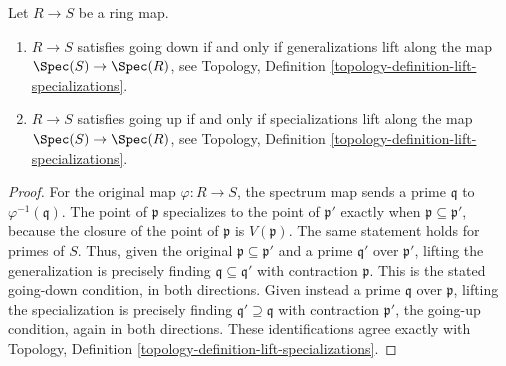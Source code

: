 \begin{lemma}
\label{lemma-going-up-down-specialization}
Let $R \to S$ be a ring map.
\begin{enumerate}
\item $R \to S$ satisfies going down if and only if
generalizations lift along the map $\Spec(S) \to \Spec(R)$,
see Topology, Definition \ref{topology-definition-lift-specializations}.
\item $R \to S$ satisfies going up if and only if
specializations lift along the map $\Spec(S) \to \Spec(R)$,
see Topology, Definition \ref{topology-definition-lift-specializations}.
\end{enumerate}
\end{lemma}

\begin{proof}
For the original map $\varphi:R\to S$, the spectrum map
sends a prime $\mathfrak q$ to $\varphi^{-1}(\mathfrak q)$.
The point of $\mathfrak p$ specializes to the point of
$\mathfrak p'$ exactly when $\mathfrak p\subseteq\mathfrak p'$,
because the closure of the point of $\mathfrak p$ is
$V(\mathfrak p)$. The same statement holds for primes of $S$.
Thus, given the original $\mathfrak p\subseteq\mathfrak p'$
and a prime $\mathfrak q'$ over $\mathfrak p'$, lifting
the generalization is precisely finding
$\mathfrak q\subseteq\mathfrak q'$ with contraction
$\mathfrak p$. This is the stated going-down condition,
in both directions. Given instead a prime $\mathfrak q$
over $\mathfrak p$, lifting the specialization is precisely
finding $\mathfrak q'\supseteq\mathfrak q$ with contraction
$\mathfrak p'$, the going-up condition, again in both
directions. These identifications agree exactly with
Topology, Definition \ref{topology-definition-lift-specializations}.
\end{proof}